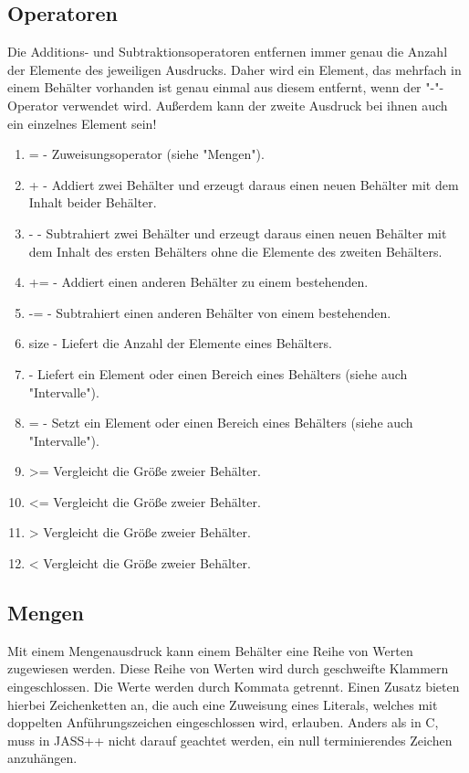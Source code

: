 \subsection{Operatoren}
Die Additions- und Subtraktionsoperatoren entfernen immer genau die Anzahl der Elemente des jeweiligen Ausdrucks.
Daher wird ein Element, das mehrfach in einem Behälter vorhanden ist genau einmal aus diesem entfernt, wenn der "-"-Operator
verwendet wird.
Außerdem kann der zweite Ausdruck bei ihnen auch ein einzelnes Element sein!
\begin{enumerate}
\item = - Zuweisungsoperator (siehe "Mengen").
\item + - Addiert zwei Behälter und erzeugt daraus einen neuen Behälter mit dem Inhalt beider Behälter.
\item - - Subtrahiert zwei Behälter und erzeugt daraus einen neuen Behälter mit dem Inhalt des ersten Behälters ohne die Elemente des zweiten Behälters.
\item += - Addiert einen anderen Behälter zu einem bestehenden.
\item -= - Subtrahiert einen anderen Behälter von einem bestehenden.
\item size - Liefert die Anzahl der Elemente eines Behälters.
\item [] - Liefert ein Element oder einen Bereich eines Behälters (siehe auch "Intervalle").
\item []= - Setzt ein Element oder einen Bereich eines Behälters (siehe auch "Intervalle").
\item >= Vergleicht die Größe zweier Behälter.
\item <= Vergleicht die Größe zweier Behälter.
\item > Vergleicht die Größe zweier Behälter.
\item < Vergleicht die Größe zweier Behälter.
\end{enumerate}

\subsection{Mengen}
Mit einem Mengenausdruck kann einem Behälter eine Reihe von Werten zugewiesen werden. Diese Reihe von Werten wird durch
geschweifte Klammern eingeschlossen. Die Werte werden durch Kommata getrennt.
Einen Zusatz bieten hierbei Zeichenketten an, die auch eine Zuweisung eines Literals, welches mit doppelten Anführungszeichen
eingeschlossen wird, erlauben.
Anders als in C, muss in JASS++ nicht darauf geachtet werden, ein null terminierendes Zeichen anzuhängen.

